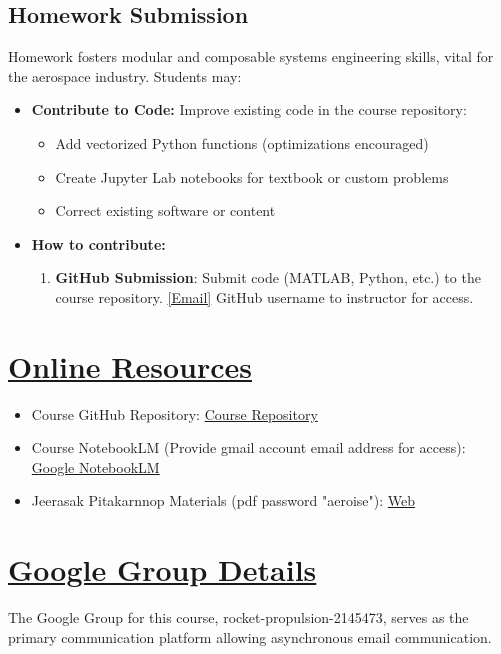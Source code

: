\documentclass[12pt]{article}
\begin{document}
\subsection{Homework Submission}
\label{sec:homework}
Homework fosters modular and composable systems engineering skills, vital for the aerospace industry. Students may:
\begin{itemize}
    \item \textbf{Contribute to Code:} Improve existing code in the course repository:
          \begin{itemize}
              \item Add vectorized Python functions (optimizations encouraged)
              \item Create Jupyter Lab notebooks for textbook or custom problems
              \item Correct existing software or content
          \end{itemize}
    \item \textbf{How to contribute:}
          \begin{enumerate}
              \item \textbf{GitHub Submission}: Submit code (MATLAB, Python, etc.) to the course repository. \href{mailto:vkhansen@eng.chula.ac.th}{[Email]} GitHub username to instructor for access.
          \end{enumerate}
\end{itemize}

\section{\hyperref[sec:resources]{Online Resources}}
\label{sec:resources}
\begin{itemize}
    \item Course GitHub Repository: \href{https://github.com/vkhansen/rocket_propulsion.git}{Course Repository}
    \item Course NotebookLM (Provide gmail account email address for access): \href{https://notebooklm.google.com/notebook/c7f10837-5c21-46ee-af09-273d38bb41a3}{Google NotebookLM}
    \item Jeerasak Pitakarnnop Materials (pdf password "aeroise"): \href{https://pitakarnnop.wordpress.com/engineering-courses/rocket-propulsion}{Web}
\end{itemize}

\section{\hyperref[sec:google_group]{Google Group Details}}
\label{sec:google_group}
The Google Group for this course, rocket-propulsion-2145473, serves as the primary communication platform allowing asynchronous email communication.
\end{document}
